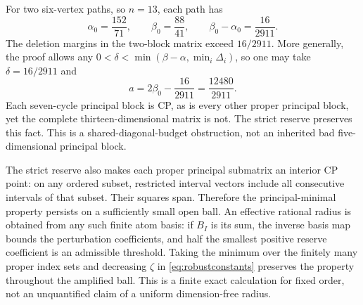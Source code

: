 For two six-vertex paths, so $n=13$, each path has
\[
 \alpha_0=\frac{152}{71},\qquad \beta_0=\frac{88}{41},\qquad
 \beta_0-\alpha_0=\frac{16}{2911}.
\]
The deletion margins in the two-block matrix exceed $16/2911$. More generally, the proof allows any $0<\delta<\min(\beta-\alpha,\min_i\Delta_i)$, so one may take $\delta=16/2911$ and
\[
 a=2\beta_0-\frac{16}{2911}=\frac{12480}{2911}.
\]
Each seven-cycle principal block is CP, as is every other proper principal block, yet the complete thirteen-dimensional matrix is not. The strict reserve preserves this fact. This is a shared-diagonal-budget obstruction, not an inherited bad five-dimensional principal block.

The strict reserve also makes each proper principal submatrix an interior CP point: on any ordered subset, restricted interval vectors include all consecutive intervals of that subset. Their squares span. Therefore the principal-minimal property persists on a sufficiently small open ball. An effective rational radius is obtained from any such finite atom basis: if $B_I$ is its sum, the inverse basis map bounds the perturbation coefficients, and half the smallest positive reserve coefficient is an admissible threshold. Taking the minimum over the finitely many proper index sets and decreasing $\zeta$ in \eqref{eq:robustconstants} preserves the property throughout the amplified ball. This is a finite exact calculation for fixed order, not an unquantified claim of a uniform dimension-free radius.


